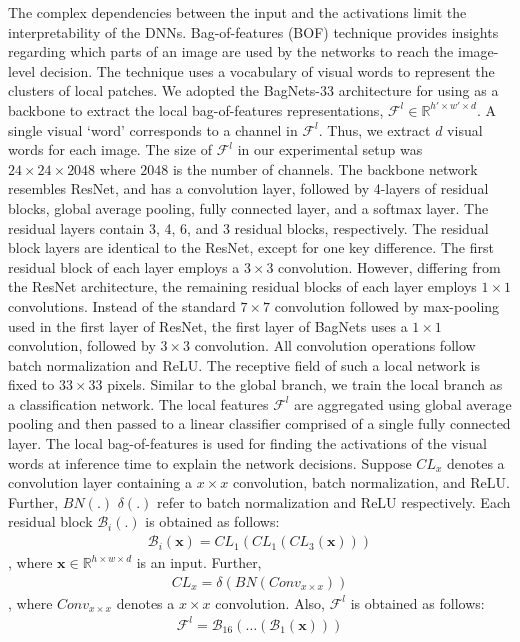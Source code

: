 %
The complex dependencies between the input and the activations limit the interpretability of the DNNs. Bag-of-features (BOF) technique provides insights regarding which parts of an image are used by the networks to reach the image-level decision. The technique uses a vocabulary of visual words to represent the clusters of local patches. We adopted the BagNets-33 \cite{bagnets} architecture for using as a backbone to extract the local bag-of-features representations, $\mathcal{F}^l \in \mathbb{R}^{h'\times w' \times d}$. A single visual `word' corresponds to a channel in $\mathcal{F}^l$. Thus, we extract $d$ visual words for each image. The size of $\mathcal{F}^l$ in our experimental setup was $24\times 24\times 2048$ where $2048$ is the number of channels. The backbone network resembles ResNet, and has a convolution layer, followed by 4-layers of residual blocks, global average pooling, fully connected layer, and a softmax layer. The residual layers contain 3, 4, 6, and 3 residual blocks, respectively. The residual block layers are identical to the ResNet, except for one key difference. The first residual block of each layer employs a $3\times3$ convolution. However, differing from the ResNet architecture, the remaining residual blocks of each layer employs $1\times1$ convolutions. Instead of the standard $7\times7$ convolution followed by max-pooling used in the first layer of ResNet, the first layer of BagNets uses a $1\times1$ convolution, followed by $3\times3$ convolution. All convolution operations follow batch normalization and ReLU. The receptive field of such a local network is fixed to $33\times33$ pixels. Similar to the global branch, we train the local branch as a classification network. The local features $\mathcal{F}^l$ are aggregated using global average pooling and then passed to a linear classifier comprised of a single fully connected layer. The local bag-of-features is used for finding the activations of the visual words at inference time to explain the network decisions. 
Suppose $CL_x$ denotes a convolution layer containing a $x\times x$ convolution, batch normalization, and ReLU. Further, $BN(.)$  $\delta(.)$ refer to batch normalization and ReLU respectively. Each residual block $\mathcal{B}_i(.)$ is obtained as follows:
\begin{align}
    \mathcal{B}_i(\mathbf{x}) = CL_1(CL_1(CL_3(\mathbf{x})))
\end{align}
, where $\mathbf{x} \in \mathbb{R}^{h\times w \times d}$ is an input. Further,
\begin{align}
    CL_x = \delta(BN(Conv_{x \times x}))
\end{align}
, where $Conv_{x\times x}$ denotes a $x\times x$ convolution. Also, $\mathcal{F}^l$ is obtained as follows:
\begin{align}
    \mathcal{F}^l = \mathcal{B}_{16}(\ldots (\mathcal{B}_1(\mathbf{x})))
\end{align}



